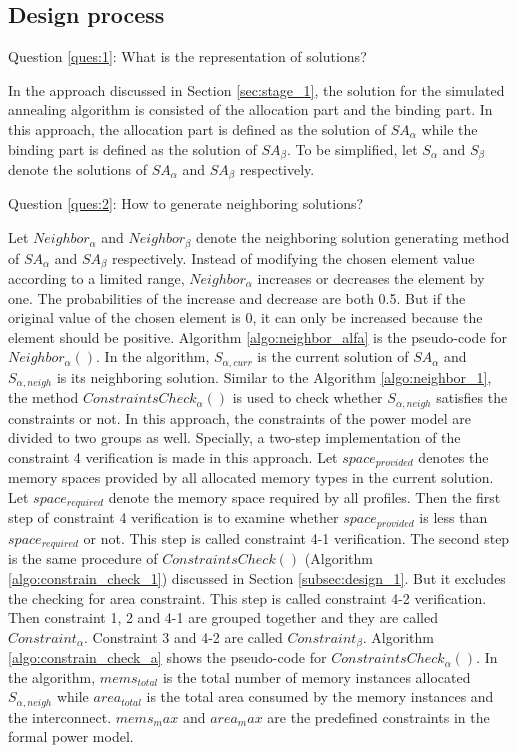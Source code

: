 		\subsection{Design process}
		\label{subsec:design_2}
		Question \ref{ques:1}: What is the representation of solutions?
		
		In the approach discussed in Section \ref{sec:stage_1}, the solution for the
		simulated annealing algorithm is consisted of the allocation part and the
		binding part. In this approach, the allocation part is defined as the
		solution of $SA_{\alpha}$ while the binding part is defined as the solution
		of $SA_{\beta}$. To be simplified, let $S_{\alpha}$ and $S_{\beta}$ denote
		the solutions of $SA_{\alpha}$ and $SA_{\beta}$ respectively.
		
		Question \ref{ques:2}: How to generate neighboring solutions?
		
		Let $Neighbor_{\alpha}$ and $Neighbor_{\beta}$ denote the neighboring
		solution generating method of $SA_{\alpha}$ and $SA_{\beta}$ respectively.
		Instead of modifying the chosen element value according to a limited range,
		$Neighbor_{\alpha}$ increases or decreases the element by one. 
		The probabilities of the increase and decrease are both 0.5.
		But if the original value of the chosen element is 0, it can only be
		increased because the element should be positive.
		Algorithm \ref{algo:neighbor_alfa} is the pseudo-code for $Neighbor_{\alpha}()$.
		In the algorithm, $S_{\alpha,curr}$ is the current solution of
		$SA_{\alpha}$ and $S_{\alpha,neigh}$ is its neighboring solution.
		Similar to the Algorithm \ref{algo:neighbor_1}, the method
		$ConstraintsCheck_{\alpha}()$ is used to check whether $S_{\alpha,neigh}$
		satisfies the constraints or not.
		In this approach, the constraints of the power model are divided to two
		groups as well.
		Specially, a two-step implementation of the constraint 4 verification
		is made in this approach.
		Let $space_{provided}$ denotes the memory spaces provided by all allocated
		memory types in the current solution.
		Let $space_{required}$ denote the memory space required by all profiles.
		Then the first step of constraint 4 verification is to examine whether
		$space_{provided}$ is less than $space_{required}$ or not. This step is
		called constraint 4-1 verification.
		The second step is the same procedure of $ConstraintsCheck()$
		(Algorithm \ref{algo:constrain_check_1}) discussed in Section \ref{subsec:design_1}.
		But it excludes the checking for area constraint. This step is called
		constraint 4-2 verification.
		Then constraint 1, 2 and 4-1 are grouped together and they are called $Constraint_{\alpha}$.
		Constraint 3 and 4-2 are called $Constraint_{\beta}$.
		Algorithm \ref{algo:constrain_check_a} shows the pseudo-code for $ConstraintsCheck_{\alpha}()$.
		In the algorithm, $mems_{total}$ is the total number of memory instances allocated
		$S_{\alpha,neigh}$ while $area_{total}$ is the total area consumed by the memory
		instances and the interconnect.
		$mems_max$ and $area_max$ are the predefined constraints in
		the formal power model.
		
		
	

